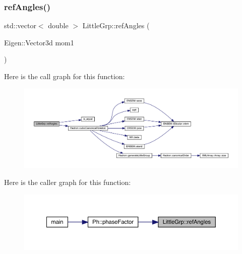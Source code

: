 \subsubsection{\texorpdfstring{refAngles()}{refAngles()}}
{\footnotesize\ttfamily std\+::vector$<$ double $>$ Little\+Grp\+::ref\+Angles (\begin{DoxyParamCaption}\item[{Eigen\+::\+Vector3d}]{mom1 }\end{DoxyParamCaption})}

Here is the call graph for this function\+:
\nopagebreak
\begin{figure}[H]
\begin{center}
\leavevmode
\includegraphics[width=350pt]{d1/d4c/namespaceLittleGrp_a93937e135b6b9c963ae9ad26516e252d_cgraph}
\end{center}
\end{figure}
Here is the caller graph for this function\+:
\nopagebreak
\begin{figure}[H]
\begin{center}
\leavevmode
\includegraphics[width=350pt]{d1/d4c/namespaceLittleGrp_a93937e135b6b9c963ae9ad26516e252d_icgraph}
\end{center}
\end{figure}
